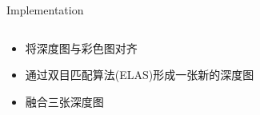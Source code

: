 \documentclass[10pt]{beamer}
\begin{document}
\begin{frame}[fragile]{Implementation}
  \vskip0.2cm
  \begin{columns}
    \begin{column}{0.4\textwidth}
      \begin{itemize}
        \item<3-> 将深度图与彩色图对齐
        \item<4-> 通过双目匹配算法(ELAS)形成一张新的深度图
        \item<5-> 融合三张深度图
      \end{itemize}
    \end{column}
  \end{columns}
\end{frame}
\end{document}
